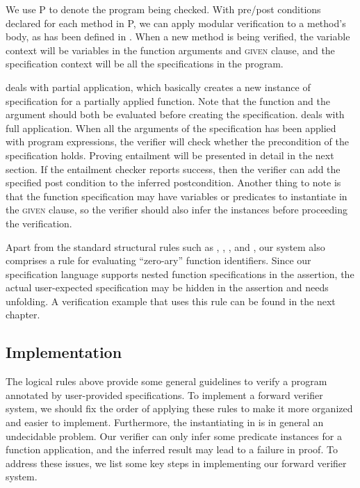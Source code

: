 We use P to denote the program being checked. With pre/post conditions declared for each method in P, we can apply modular verification to a method’s body, as has been defined in . When a new method is being verified, the variable context will be variables in the function arguments and \textsc{given} clause, and the specification context will be all the specifications in the program.

 deals with partial application, which basically creates a new instance of specification for a partially applied function. Note that the function and the argument should both be evaluated before creating the specification.  deals with full application. When all the arguments of the specification has been applied with program expressions, the verifier will check whether the precondition of the specification holds. Proving entailment will be presented in detail in the next section. If the entailment checker reports success, then the verifier can add the specified post condition to the inferred postcondition. Another thing to note is that the function specification may have variables or predicates to instantiate in the \textsc{given} clause, so the verifier should also infer the instances before proceeding the verification.

Apart from the standard structural rules such as , , , and , our system also comprises a rule  for evaluating ``zero-ary'' function identifiers. Since our specification language supports nested function specifications in the assertion, the actual user-expected specification may be hidden in the assertion and needs unfolding. A verification example that uses this rule can be found in the next chapter.


\subsection{Implementation}

The logical rules above provide some general guidelines to verify a program annotated by user-provided specifications. To implement a forward verifier system, we should fix the order of applying these rules to make it more organized and easier to implement. Furthermore, the instantiating in  is in general an undecidable problem. Our verifier can only infer some predicate instances for a function application, and the inferred result may lead to a failure in proof. To address these issues, we list some key steps in implementing our forward verifier system.

